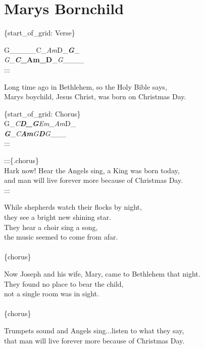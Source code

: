 \documentclass[
  letterpaper,
]{scrbook}
\begin{document}
\hypertarget{marys-bornchild}{%
\chapter{Marys Bornchild}\label{marys-bornchild}}

\{start\_of\_grid: Verse\}

G\_\_\_\_\_\textbar C\_\emph{Am}\textbar D\_\textbf{\emph{\textbar G}}\_\emph{\textbar{}\\
G}\_\textbf{\emph{\textbar C}\_Am\_\textbar D}\_\emph{\textbar G}\_\_\_\_\textbar{}\\
:::

Long time ago in Bethlehem, so the Holy Bible says, ~\\
Mary\textquotesingle s boychild, Jesus Christ, was born on Christmas
Day.

\{start\_of\_grid: Chorus\}\\
G\_\emph{C\textbf{\textbar D\_\emph{G}}\textbar Em\_Am}\textbar D\_\textbf{\emph{\textbar{}\\
G}}\_\emph{\textbar C\textbf{Am}\textbar G\textbf{D}\textbar G}\_\_\_\textbar{}\\
:::

:::\{.chorus\}\\
Hark now! Hear the Angels sing, a King was born today,\\
and man will live forever more because of Christmas Day.\\
::: ~

While shepherds watch their flocks by night,\\
they see a bright new shining star.\\
They hear a choir sing a song, ~\\
the music seemed to come from afar. ~\\
\hspace*{0.333em}\\
\{chorus\}

Now Joseph and his wife, Mary, came to Bethlehem that night.\\
They found no place to bear the child, ~\\
not a single room was in sight. ~ ~ ~\\
\hspace*{0.333em}\\
\{chorus\}

Trumpets sound and Angels sing...listen to what they say,\\
that man will live forever more because of Christmas Day.
\end{document}
